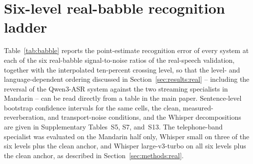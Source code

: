 \section{Six-level real-babble recognition ladder}
\label{app:babble}

Table~\ref{tab:babble} reports the point-estimate recognition error of every
system at each of the six real-babble signal-to-noise ratios of the
real-speech validation, together with the interpolated ten-percent crossing
level, so that the level- and language-dependent ordering discussed in
Section~\ref{sec:results:real} -- including the reversal of the Qwen3-ASR
system against the two streaming specialists in Mandarin -- can be read
directly from a table in the main paper. Sentence-level bootstrap confidence
intervals for the same cells, the clean, measured-reverberation, and
transport-noise conditions, and the Whisper decompositions are given in
Supplementary Tables~S5, S7, and~S13. The
telephone-band specialist was evaluated on the Mandarin half only, Whisper
small on three of the six levels plus the clean anchor, and Whisper large-v3-turbo on all six
levels plus the clean anchor, as described in
Section~\ref{sec:methods:real}.

